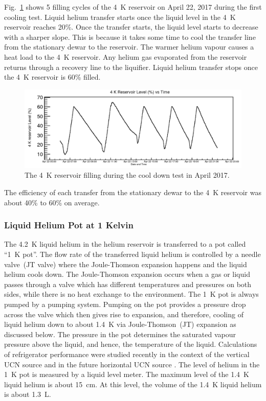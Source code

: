 Fig.~\ref{fig:4kfilling} shows 5 filling cycles of the 4~K reservoir
on April 22, 2017 during the first cooling test. Liquid helium
transfer starts once the liquid level in the 4~K reservoir reaches
20\%. Once the transfer starts, the liquid level starts to decrease
with a sharper slope. This is because it takes some time to cool the
transfer line from the stationary dewar to the reservoir. The warmer
helium vapour causes a heat load to the 4~K reservoir. Any helium gas
evaporated from the reservoir returns through a recovery line to the
liquifier. Liquid helium transfer stops once the 4~K reservoir is 60\%
filled.

\begin{figure}[h!]
  \centering
  \includegraphics[width=1.0\textwidth]{april_4kfilling.png}
  \caption{The 4~K reservoir filling during the cool down test in
    April 2017.}
  \label{fig:4kfilling}
\end{figure}
The efficiency of each transfer from the stationary dewar to the 4~K
reservoir was about 40\% to 60\% on average.

\subsubsection{Liquid Helium Pot at 1 Kelvin}
The 4.2~K liquid helium in the helium reservoir is transferred to a pot
called ``1~K pot''. The flow rate of the transferred liquid helium is
controlled by a needle valve~(JT valve) where the Joule-Thomson
expansion happens and the liquid helium cools down. The Joule-Thomson
expansion occurs when a gas or liquid passes through a valve which has
different temperatures and pressures on both sides, while there is no
heat exchange to the environment.  The 1~K pot is always pumped by a
pumping system. Pumping on the pot provides a pressure drop across the
valve which then gives rise to expansion, and therefore, cooling of
liquid helium down to about 1.4~K via Joule-Thomson~(JT) expansion as
discussed below. The pressure in the pot determines the saturated
vapour pressure above the liquid, and hence, the temperature of the
liquid.  Calculations of refrigerator performance were studied
recently in the context of the vertical UCN source
\cite{Florian_thesis} and in the future horizontal UCN source
\cite{sweitz}. The level of helium in the 1~K pot is measured by a
liquid level meter. The maximum level of the 1.4~K liquid helium is
about 15~cm. At this level, the volume of the 1.4~K liquid helium is
about 1.3~L.


